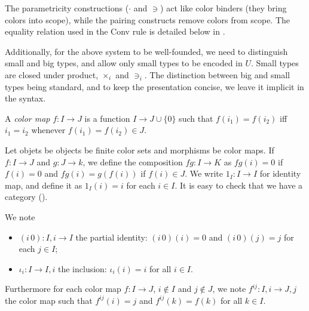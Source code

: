 \documentclass[english]{PaperTools/latex/lipics}
\def\pI{\ensuremath{\mathbf{pI}}}
\begin{document}
The parametricity constructions ($·$ and $∋$) act like color
binders (they bring colors into scope), while the pairing constructs
remove colors from scope.
The equality relation used in the {\sc Conv} rule is detailed below in .

Additionally, for the above system to be well-founded, we need to
distinguish small and big types, and allow only small types to be
encoded in $U$. Small types are closed under product, $×_i$ and
$∋_i$. The distinction between big and small types being standard, and
to keep the presentation concise, we leave it implicit in the syntax.

\begin{definition}
  A \emph{color map} $f : I → J$ is a function $I → J ∪ \{0\}$ such that
  $f(i_1) = f(i_2)$ iff $i_1 = i_2$ whenever $f(i_1) = f(i_2) ∈ J$.
%
%
\end{definition}

\begin{definition}[Category $\pI{}$]
  \label{def:pI}
  Let objets be objects be finite color sets
  and morphisms be color maps.
  If $f : I → J$ and $g : J → k$, we define the composition $fg : I → K$
  as $fg(i) = 0$ if $f(i) = 0$ and $fg(i) = g(f(i))$ if $f(i) ∈ J$.
  We write $1_I : I → I$ for identity map, and define it as $1_I(i) = i$ for each $i ∈ I$.
  It is easy to check that we have a category (\cite[ex.~9.7 p.~176]{PittsAM:nomsns}).
\end{definition}

We note
\begin{itemize}
\item $(i\,0) : I,i → I$ the partial identity: $(i\,0)(i) = 0$ and $(i\,0)(j) = j$ for each $j ∈ I$; 
\item $ι_i : I → I,i$ the inclusion: $ι_i(i) =i$ for all $i ∈ I$.
\end{itemize}
Furthermore for each color map $f : I → J$, $i ∉ I$ and $j ∉ J$, we
note $f^{ij} : I,i → J,j$ the color map such that
$f^{ij}(i) = j$ and $f^{ij}(k) = f(k)$ for all $k ∈ I$.
\end{document}
